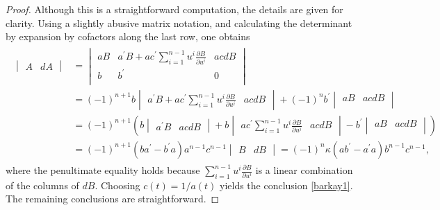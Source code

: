 \documentclass [leqno, 10pt]{amsart}
\theoremstyle{definition}
\numberwithin{equation}{section}
\newcommand{\ka}{\kappa}
\newcommand{\pr}{\partial}
\begin{document}
\begin{proof}
Although this is a straightforward computation, the details are given for clarity. 
Using a slightly abusive matrix notation, and calculating the determinant by expansion by cofactors along the last row, one obtains
\begin{align}
\begin{split}
\begin{vmatrix} A& dA \end{vmatrix} & = 
\begin{vmatrix} 
aB& a^{\prime}B + ac^{\prime}\sum_{i = 1}^{n-1}u^{i}\tfrac{\pr B}{\pr u^{i}} & ac dB\\
b & b^{\prime} & 0 \\
\end{vmatrix} \\
& = (-1)^{n+1}b \begin{vmatrix} a^{\prime} B  + ac^{\prime}\sum_{i = 1}^{n-1}u^{i}\tfrac{\pr B}{\pr u^{i}}& ac dB \end{vmatrix} + (-1)^{n}b^{\prime}\begin{vmatrix} aB & ac dB\\ \end{vmatrix}\\
& = (-1)^{n+1}\left(b \begin{vmatrix} a^{\prime} B & ac dB \end{vmatrix} +b \begin{vmatrix}  ac^{\prime}\sum_{i = 1}^{n-1}u^{i}\tfrac{\pr B}{\pr u^{i}}& ac dB \end{vmatrix} - b^{\prime}\begin{vmatrix} aB & ac dB\\ \end{vmatrix}\right)\\
& = (-1)^{n+1}\left(ba^{\prime} - b^{\prime}a\right)a^{n-1}c^{n-1}\begin{vmatrix} B & dB \end{vmatrix} = (-1)^{n}\ka \left(ab^{\prime} - a^{\prime}a\right)b^{n-1}c^{n-1},%
\end{split}
\end{align}
where the penultimate equality holds because $\sum_{i = 1}^{n-1}u^{i}\tfrac{\pr B}{\pr u^{i}}$ is a linear combination of the columns of $dB$. Choosing $c(t) = 1/a(t)$ yields the conclusion \eqref{barkay1}. The remaining conclusions are straightforward.
\end{proof}
\end{document}

